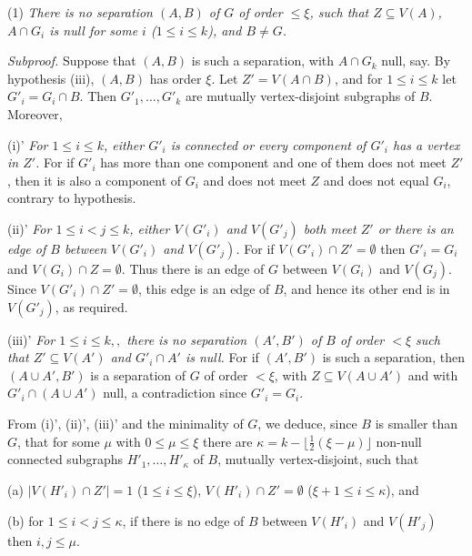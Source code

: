 \hspace*{12pt}(1) \textit{There is no separation $(A, B)$ of $G$ of order $\le \xi$, such that $Z \subseteq V(A)$, $A \cap G_i$ is null for some $i$ ($1 \le i \le k$), and $B \ne G$.}

\textit{Subproof.} Suppose that $(A, B)$ is such a separation, with $A \cap G_k$ null, say. By hypothesis (iii), $(A, B)$ has order $\xi$. Let $Z' = V(A \cap B)$, and for $1 \le i \le k$ let $G'_i = G_i \cap B$. Then $G'_1, \dots, G'_k$ are mutually vertex-disjoint subgraphs of $B$. Moreover,

(i)' \textit{For $1 \le i \le k$, either $G'_i$ is connected or every component of $G'_i$ has a vertex in $Z'$.} For if $G'_i$ has more than one component and one of them does not meet $Z'$, then it is also a component of $G_i$ and does not meet $Z$ and does not equal $G_i$, contrary to hypothesis.

(ii)' \textit{For $1 \le i < j \le k$, either $V(G'_i)$ and $V(G'_j)$ both meet $Z'$ or there is an edge of $B$ between $V(G'_i)$ and $V(G'_j)$.} For if $V(G'_i) \cap Z' = \emptyset$ then $G'_i = G_i$ and $V(G_i) \cap Z = \emptyset$. Thus there is an edge of $G$ between $V(G_i)$ and $V(G_j)$. Since $V(G'_i) \cap Z' = \emptyset$, this edge is an edge of $B$, and hence its other end is in $V(G'_j)$, as required.

(iii)' \textit{For $1 \le i \le k,,$ there is no separation $(A', B')$ of $B$ of order $< \xi$ such that $Z' \subseteq V(A')$ and $G'_i \cap A'$ is null.} For if $(A', B')$ is such a separation, then $(A \cup A', B')$ is a separation of $G$ of order $< \xi$, with $Z \subseteq V(A \cup A')$ and with $G'_i \cap (A \cup A')$ null, a contradiction since $G'_i = G_i$.

From (i)', (ii)', (iii)' and the minimality of $G$, we deduce, since $B$ is smaller than $G$, that for some $\mu$ with $0 \le \mu \le \xi$ there are $\kappa = k - \lfloor \frac{1}{2}(\xi - \mu) \rfloor$ non-null connected subgraphs $H'_1, \dots, H'_\kappa$ of $B$, mutually vertex-disjoint, such that

\hspace*{12pt}(a) $|V(H'_i) \cap Z'| = 1$ ($1 \le i \le \xi$), $V(H'_i) \cap Z' = \emptyset$ ($\xi + 1 \le i \le \kappa$), and

\hspace*{12pt}(b) for $1 \le i < j \le \kappa$, if there is no edge of $B$ between $V(H'_i)$ and $V(H'_j)$ then $i, j \le \mu$.

